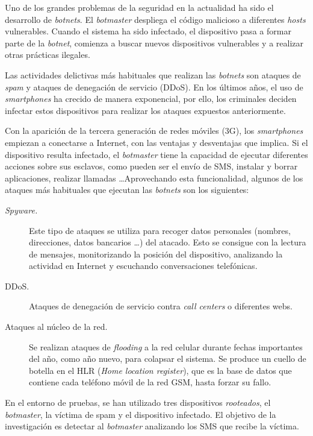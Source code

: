\documentclass[a4paper,11pt]{report}
\begin{document}
Uno de los grandes problemas de la seguridad en la actualidad ha sido el desarrollo de \emph{botnets}. El \emph{botmaster} despliega el código malicioso a diferentes \emph{hosts} vulnerables. Cuando el sistema ha sido infectado, el dispositivo pasa a formar parte de la \emph{botnet}, comienza a buscar nuevos dispositivos vulnerables y a realizar otras prácticas ilegales.

Las actividades delictivas más habituales que realizan las \emph{botnets} son ataques de \emph{spam} y ataques de denegación de servicio (DDoS). En los últimos años, el uso de \emph{smartphones} ha crecido de manera exponencial, por ello, los criminales deciden infectar estos dispositivos para realizar los ataques expuestos anteriormente.

Con la aparición de la tercera generación de redes móviles (3G), los \emph{smartphones} empiezan a conectarse a Internet, con las ventajas y desventajas que implica. Si el dispositivo resulta infectado, el \emph{botmaster} tiene la capacidad de ejecutar diferentes acciones sobre sus esclavos, como pueden ser el envío de SMS, instalar y borrar aplicaciones, realizar llamadas \ldots Aprovechando esta funcionalidad, algunos de los ataques más habituales que ejecutan las \emph{botnets} son los siguientes:

\begin{description}
\item[\emph{Spyware.}] Este tipo de ataques se utiliza para recoger datos personales (nombres, direcciones, datos bancarios \ldots) del atacado. Esto se consigue con la lectura de mensajes, monitorizando la posición del dispositivo, analizando la actividad en Internet y escuchando conversaciones telefónicas.
\item[DDoS.] Ataques de denegación de servicio contra \emph{call centers} o diferentes webs.
\item[Ataques al núcleo de la red.] Se realizan ataques de \emph{flooding} a la red celular durante fechas importantes del año, como año nuevo, para colapsar el sistema. Se produce un cuello de botella en el HLR (\emph{Home location register}), que es la base de datos que contiene cada teléfono móvil de la red GSM, hasta forzar su fallo.
\end{description}

En el entorno de pruebas, se han utilizado tres dispositivos \emph{rooteados}, el \emph{botmaster}, la víctima de spam y el dispositivo infectado. El objetivo de la investigación es detectar al \emph{botmaster} analizando los SMS que recibe la víctima.
\end{document}
